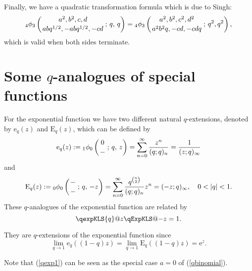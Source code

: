\documentclass[envcountchap,graybox]{svmono}
\newcommand{\qhyp}[5]{\mbox{}_{#1}{\phi}_{#2}
\left(\genfrac{}{}{0pt}{}{#3}{#4}\,;\,q,\,#5\right)}
\newcommand{\e}{\textrm{e}}
\renewcommand{\E}{\textrm{E}}
\begin{document}
Finally, we have a quadratic transformation formula which is due to Singh:
\begin{equation}
\label{Singh}\index{Singh's transformation formula}\index{Transformation formula!Singh}
\qhyp{4}{3}{a^2,b^2,c,d}{abq^{1/2},-abq^{1/2},-cd}{q}=
\mbox{}_4\phi_3\left(\genfrac{}{}{0pt}{}{a^2,b^2,c^2,d^2}{a^2b^2q,-cd,-cdq}\,;\,q^2,q^2\right),
\end{equation}
which is valid when both sides terminate.

\section{Some $q$-analogues of special functions}
\par\setcounter{equation}{0}
\label{special functions}

For the exponential function we have two different natural $q$-extensions,
denoted by ${\mathrm e}_q(z)$ and $\E_q(z)$, which can be defined by
\begin{equation}
\label{qexp1}\index{q-Exponential function@$q$-Exponential function}
{\mathrm e}_q(z):=\qhyp{1}{0}{0}{-}{z}=\sum_{n=0}^{\infty}\frac{z^n}{(q;q)_n}
=\frac{1}{(z;q)_{\infty}}
\end{equation}
and
\begin{equation}
\label{qexp2}
\E_q(z):=\qhyp{0}{0}{-}{-}{-z}=
\sum_{n=0}^{\infty}\frac{q^{\binom{n}{2}}}{(q;q)_n}z^n=(-z;q)_{\infty},\quad 0<|q|<1.
\end{equation}
These $q$-analogues of the exponential function are related by
$$\qexpKLS{q}@{z}\qExpKLS@{-z}=1.$$

They are $q$-extensions of the exponential function since
$$\lim\limits_{q\rightarrow 1}{\mathrm e}_q((1-q)z)=\lim\limits_{q\rightarrow 1}\E_q((1-q)z)=\e^z.$$

Note that (\ref{qexp1}) can be seen as the special case $a=0$ of (\ref{qbinomial}).
\end{document}

